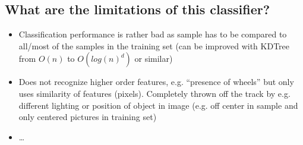 \subsection{What are the limitations of this classifier?}
\begin{itemize}
\item Classification performance is rather bad as sample has to be compared to all/most of the samples in the training set (can be improved with KDTree from $O(n)$ to $O(log(n)^d)$ or similar)
\item Does not recognize higher order features, e.g. ``presence of wheels'' but only uses similarity of features (pixels). Completely thrown off the track by e.g. different lighting or position of object in image (e.g. off center in sample and only centered pictures in training set)
\item \ldots
\end{itemize}

